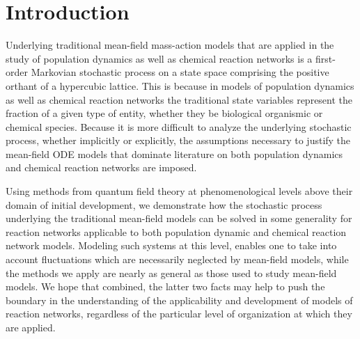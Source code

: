 \section{\label{sec:intro}Introduction}
Underlying traditional mean-field mass-action models that are applied in the study of population dynamics as well as chemical reaction networks is a first-order Markovian stochastic process on a state space comprising the positive orthant of a hypercubic lattice. This is because in models of population dynamics as well as chemical reaction networks the traditional state variables represent the fraction of a given type of entity, whether they be biological organismic or chemical species. Because it is more difficult to analyze the underlying stochastic process, whether implicitly or explicitly, the assumptions necessary to justify the mean-field ODE models that dominate literature on both population dynamics and chemical reaction networks are imposed.


Using methods from quantum field theory at phenomenological levels above their domain of initial development, we demonstrate how the stochastic process underlying the traditional mean-field models can be solved in some generality for reaction networks applicable to both population dynamic and chemical reaction network models. Modeling such systems at this level, enables one to take into account fluctuations which are necessarily neglected by mean-field models, while the methods we apply are nearly as general as those used to study mean-field models. We hope that combined, the latter two facts may help to push the boundary in the understanding of the applicability and development of models of reaction networks, regardless of the particular level of organization at which they are applied.
